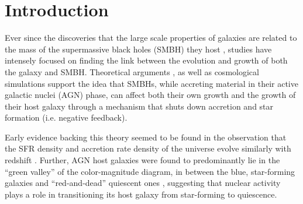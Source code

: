 \documentclass[fleqn, usenatbib]{mnras}
\begin{document}
\section{Introduction}
Ever since the discoveries that the large scale properties of galaxies are related to the mass of the supermassive black holes (SMBH) they host \citep{Magorrian:1998qv, Ferrarese:2000gf, Gebhardt:2000xy, Marconi:2003ve, Haring:2004ly, Gultekin:2009ul, McConnell:2013fk, Kormendy:2013fj}, studies have intensely focused on finding the link between the evolution and growth of both the galaxy and SMBH. Theoretical arguments \citep[eg.][]{Silk:1998qf}, as well as cosmological simulations  \citep[e.g][]{Croton:2006kx, Bower:2006gf} support the idea that SMBHs, while accreting material in their active galactic nuclei (AGN) phase, can affect both their own growth and the growth of their host galaxy through a mechanism that shuts down accretion and star formation (i.e. negative feedback). 



Early evidence backing this theory seemed to be found in the observation that the SFR density and accretion rate density of the universe evolve similarly with redshift  \citep{Boyle:1998vn, Franceschini:1999ys, Silverman:2008zl, Silverman:2009lq, Aird:2010fr, Merloni:2013zr}. Further, AGN host galaxies were found to predominantly lie in the ``green valley''  of the color-magnitude diagram, in between the blue, star-forming galaxies and ``red-and-dead'' quiescent ones \citep{Martin:2007yg, Nandra:2007rz, Silverman:2008zl, Schawinski:2010zr, Koss:2011vn}, suggesting that nuclear activity plays a role in transitioning its host galaxy from star-forming to quiescence. 
\end{document}

